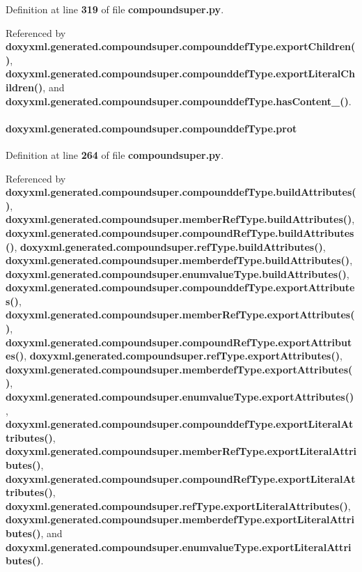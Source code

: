 Definition at line {\bf 319} of file {\bf compoundsuper.\+py}.



Referenced by {\bf doxyxml.\+generated.\+compoundsuper.\+compounddef\+Type.\+export\+Children()}, {\bf doxyxml.\+generated.\+compoundsuper.\+compounddef\+Type.\+export\+Literal\+Children()}, and {\bf doxyxml.\+generated.\+compoundsuper.\+compounddef\+Type.\+has\+Content\+\_\+()}.

\paragraph[{prot}]{\setlength{\rightskip}{0pt plus 5cm}doxyxml.\+generated.\+compoundsuper.\+compounddef\+Type.\+prot}\label{classdoxyxml_1_1generated_1_1compoundsuper_1_1compounddefType_ab1a0fa28db130e4fe4a652e4bfbf2352}


Definition at line {\bf 264} of file {\bf compoundsuper.\+py}.



Referenced by {\bf doxyxml.\+generated.\+compoundsuper.\+compounddef\+Type.\+build\+Attributes()}, {\bf doxyxml.\+generated.\+compoundsuper.\+member\+Ref\+Type.\+build\+Attributes()}, {\bf doxyxml.\+generated.\+compoundsuper.\+compound\+Ref\+Type.\+build\+Attributes()}, {\bf doxyxml.\+generated.\+compoundsuper.\+ref\+Type.\+build\+Attributes()}, {\bf doxyxml.\+generated.\+compoundsuper.\+memberdef\+Type.\+build\+Attributes()}, {\bf doxyxml.\+generated.\+compoundsuper.\+enumvalue\+Type.\+build\+Attributes()}, {\bf doxyxml.\+generated.\+compoundsuper.\+compounddef\+Type.\+export\+Attributes()}, {\bf doxyxml.\+generated.\+compoundsuper.\+member\+Ref\+Type.\+export\+Attributes()}, {\bf doxyxml.\+generated.\+compoundsuper.\+compound\+Ref\+Type.\+export\+Attributes()}, {\bf doxyxml.\+generated.\+compoundsuper.\+ref\+Type.\+export\+Attributes()}, {\bf doxyxml.\+generated.\+compoundsuper.\+memberdef\+Type.\+export\+Attributes()}, {\bf doxyxml.\+generated.\+compoundsuper.\+enumvalue\+Type.\+export\+Attributes()}, {\bf doxyxml.\+generated.\+compoundsuper.\+compounddef\+Type.\+export\+Literal\+Attributes()}, {\bf doxyxml.\+generated.\+compoundsuper.\+member\+Ref\+Type.\+export\+Literal\+Attributes()}, {\bf doxyxml.\+generated.\+compoundsuper.\+compound\+Ref\+Type.\+export\+Literal\+Attributes()}, {\bf doxyxml.\+generated.\+compoundsuper.\+ref\+Type.\+export\+Literal\+Attributes()}, {\bf doxyxml.\+generated.\+compoundsuper.\+memberdef\+Type.\+export\+Literal\+Attributes()}, and {\bf doxyxml.\+generated.\+compoundsuper.\+enumvalue\+Type.\+export\+Literal\+Attributes()}.

